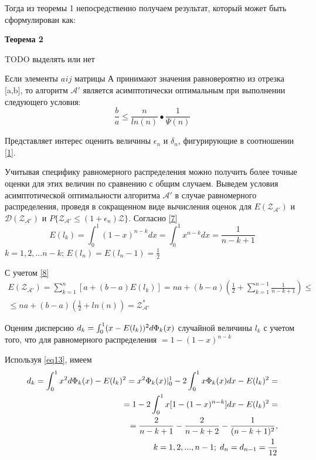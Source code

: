 \documentclass[a4paper, 14pt]{extarticle}
\begin{document}
Тогда из теоремы 1 непосредственно получаем результат, который может быть сформулирован как:

\textbf{Теорема 2}

TODO выделять или нет 

Если элементы $a_{}ij$ матрицы А принимают значения равновероятно из отрезка [a,b], то алгоритм $\mathcal{A'}$ является асимптотически оптимальным при выполнении следующего условия:
\begin{equation}
\frac{b}{a} \leq \frac{n}{ln(n)}•\frac{1}{\Psi(n)}
\end{equation}

Представляет интерес оценить величины $\epsilon_n$ и $\delta_n$, фигурирующие в соотношении \eqref{1}.

Учитывая специфику равномерного распределения можно получить более точные оценки для этих величин по сравнению с общим случаем. Выведем условия асимптотической оптимальности алгоритма $\mathcal{A'}$ в случае равномерного распределения, проведя в сокращенном виде вычисления оценок для $E(\mathcal{Z_{A'}})$ и $\mathcal{D(Z_{A'})}$ и $P \{ \mathcal{Z_{A'}} \leq (1+\epsilon_n)\mathcal{Z} \}$. Согласно \eqref{7}
\begin{equation}\label{eq13} 
E(l_k) = \int_0^1 (1-x)^{n-k}dx = \int_0^1 x^{n-k}dx = \frac{1}{n-k+1}
\end{equation}
$k=1,2,...n-k$;   $ E(l_n) = E(l_n-1) = \frac{1}{2}$

С учетом \eqref{8}
\begin{equation}
\begin{aligned}
E(\mathcal{Z_{A'}}) = \sum_{k=1}^{n} [a+(b-a)E(l_k)] = na +(b-a)(\frac{1}{2}+\sum_{k=1}^{n-1} \frac{1}{n-k+1}) \leq \\
\leq na+(b-a)(\frac{1}{2} + ln(n)) = \mathcal{Z^*_{A'}}
\end{aligned}
\end{equation}

Оценим дисперсию $d_k=\int_0^1 (x-E(l_k))^2 d\text{$\Phi_k(x)$}$ случайной величины $l_k$ с учетом того, что для равномерного распределения \chanceLklesserX $ = 1-(1-x)^{n-k}$

Используя \eqref{eq13}, имеем
\begin{equation}
\begin{aligned}
d_k = \int_0^1 x^2 d \text{$\Phi_k(x)$}-E(l_k)^2=x^2 \text{$\Phi_k(x)$} 	
|_0^1 - 2 \int_0^1 x \text{$\Phi_k(x)$}dx - E(l_k)^2=\\
= 1-2\int_0^1 x[1-(1-x)^{n-k}]dx-E(l_k)^2 =\\
= \frac{2}{n-k+1} - \frac{2}{n-k+2} - \frac{1}{(n-k+1)^2}, \\ 
\; k=1,2,...,n-1; \; d_n = d_{n-1} = \frac{1}{12}
\end{aligned}
\end{equation}
\end{document}
